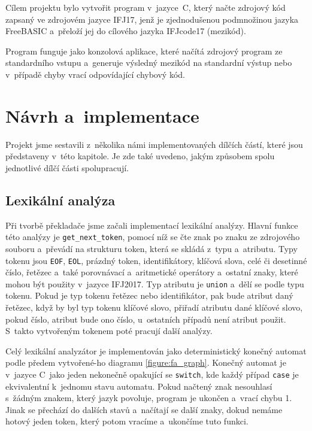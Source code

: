 \documentclass[a4paper, 11pt]{article}
\begin{document}
	Cílem projektu bylo vytvořit program v~jazyce~C, který načte zdrojový kód zapsaný ve zdrojovém jazyce IFJ17,
	jenž je zjednodušenou podmnožinou jazyka FreeBASIC a~přeloží jej do cílového jazyka IFJcode17 (mezikód).

	Program funguje jako konzolová aplikace, které načítá zdrojový program ze standardního vstupu a~generuje
	výsledný mezikód na standardní výstup nebo v~případě chyby vrací odpovídající chybový kód.


	\section{Návrh a~implementace}

	Projekt jsme sestavili z~několika námi implementovaných dílčích částí, které jsou představeny v~této kapitole.
	Je zde také uvedeno, jakým způsobem spolu jednotlivé dílčí části spolupracují.


	\subsection{Lexikální analýza}

	Při tvorbě překladače jsme začali implementací lexikální analýzy. Hlavní funkce této analýzy je \texttt{get\_next\_token}, 
	pomocí níž se čte znak po znaku ze zdrojového souboru a~převádí na strukturu token, která se skládá z~typu a~atributu. 
	Typy tokenu jsou \texttt{EOF}, \texttt{EOL}, prázdný token, identifikátory, klíčová slova, celé či desetinné číslo, řetězec 
	a~také porovnávací a~aritmetické operátory a~ostatní znaky, které mohou být použity v~jazyce IFJ2017. Typ atributu je 
	\texttt{union} a~dělí se podle typu tokenu. Pokud je typ tokenu řetězec nebo identifikátor, pak bude atribut daný řetězec, 
	když by byl typ tokenu klíčové slovo, přiřadí atributu dané klíčové slovo, pokud číslo, atribut bude ono číslo, u~ostatních 
	případů není atribut použit. S~takto vytvořeným tokenem poté pracují další analýzy.

	Celý lexikální analyzátor je implementován jako deterministický konečný automat podle předem vytvořené-ho diagramu 
	\ref{figure:fa_graph}. Konečný automat je v~jazyce C~jako jeden nekonečně opakující se \texttt{switch}, kde každý případ 
	\texttt{case} je ekvivalentní k~jednomu stavu automatu. Pokud načtený znak nesouhlasí s~žádným znakem, který jazyk povoluje, 
	program je ukončen a~vrací chybu 1. Jinak se přechází do dalších stavů a~načítají se další znaky, dokud nemáme hotový jeden 
	token, který potom vracíme a~ukončíme tuto funkci. 
\end{document}
